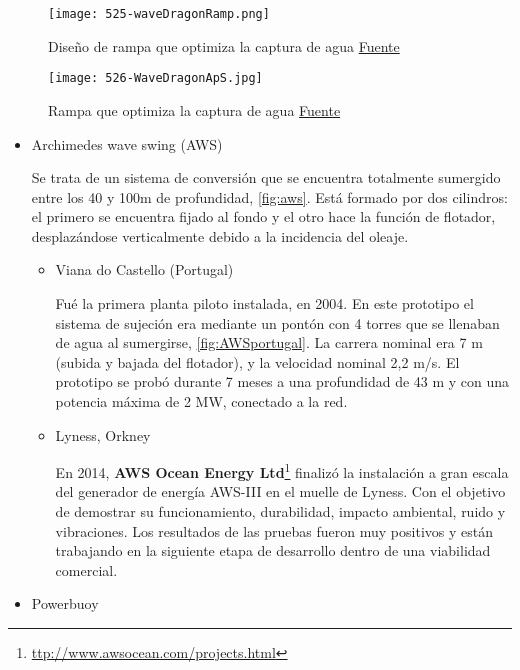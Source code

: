 \begin{figure}
\centering
\texttt{[image: 525-waveDragonRamp.png]}
\caption[Diseño de rampa que optimiza la captura de agua]{Diseño de rampa que optimiza la captura de agua \href{www.wavedragon.net}{Fuente}}
\label{fig:waveDragonRamp}
\end{figure}

\begin{figure}
\centering
\texttt{[image: 526-WaveDragonApS.jpg]}
\caption[Rampa que optimiza la captura de agua]{Rampa que optimiza la captura de agua \href{www.wavedragon.net}{Fuente}}
\label{fig:WaveDragonApS}
\end{figure}

\begin{itemize}
\item
  Archimedes wave swing (AWS)

  Se trata de un sistema de conversión que se encuentra totalmente
  sumergido entre los 40 y 100m de profundidad, \autoref{fig:aws}. Está formado por dos
  cilindros: el primero se encuentra fijado al fondo y el otro hace la
  función de flotador, desplazándose verticalmente debido a la
  incidencia del oleaje.



  \begin{itemize}
  \item
    Viana do Castello (Portugal)

    Fué la primera planta piloto instalada, en 2004. En este prototipo
    el sistema de sujeción era mediante un pontón con 4 torres que se
    llenaban de agua al sumergirse, \autoref{fig:AWSportugal}. La carrera nominal era 7 m (subida y
    bajada del flotador), y la velocidad nominal 2,2 m/s. El prototipo
    se probó durante 7 meses a una profundidad de 43 m y con una
    potencia máxima de 2 MW, conectado a la red.



  \item
    Lyness, Orkney

    En 2014, \textbf{AWS Ocean Energy Ltd}\footnote{\url{ttp://www.awsocean.com/projects.html}} finalizó la instalación a
    gran escala del generador de energía AWS-III en el muelle de Lyness.
    Con el objetivo de demostrar su funcionamiento, durabilidad, impacto
    ambiental, ruido y vibraciones. Los resultados de las pruebas fueron
    muy positivos y están trabajando en la siguiente etapa de desarrollo
    dentro de una viabilidad comercial.
  \end{itemize}
\item
  Powerbuoy


\end{itemize}
